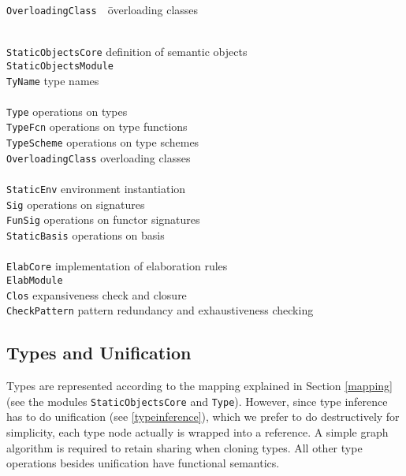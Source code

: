 \documentclass[twoside,titlepage]{article}
\begin{document}
\begin{quoting}
\begin{tabbing}
{\tt OverloadingClass\ \ }\qquad\= overloading classes
\kill

\hspace{-1em}{\tt elab/} \\
{\tt StaticObjectsCore}	\> definition of semantic objects \\
{\tt StaticObjectsModule} \> \\

{\tt TyName}		\> type names \\
\\
{\tt Type}		\> operations on types \\
{\tt TypeFcn}		\> operations on type functions \\
{\tt TypeScheme}	\> operations on type schemes \\
{\tt OverloadingClass}	\> overloading classes \\
\\
{\tt StaticEnv}		\> environment instantiation \\
{\tt Sig}		\> operations on signatures \\
{\tt FunSig}		\> operations on functor signatures \\
{\tt StaticBasis}	\> operations on basis \\
\\
{\tt ElabCore}		\> implementation of elaboration rules \\
{\tt ElabModule}	\> \\
{\tt Clos}		\> expansiveness check and closure \\
{\tt CheckPattern}	\> pattern redundancy and exhaustiveness checking \\
\end{tabbing}
\end{quoting}


\subsection{Types and Unification}
\label{types}

Types are represented according to the mapping explained in Section \ref{mapping} (see the modules {\tt StaticObjectsCore} and {\tt Type}). However, since type inference has to do unification (see \ref{typeinference}), which we prefer to do destructively for simplicity, each type node actually is wrapped into a reference. A simple graph algorithm is required to retain sharing when cloning types. All other type operations besides unification have functional semantics.
\end{document}
